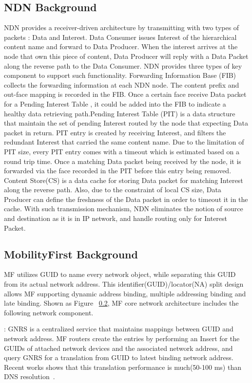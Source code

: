 \subsection{NDN Background}
NDN provides a receiver-driven architecture by transmitting with two types of packets : Data and Interest. Data Consumer issues Interest of the hierarchical content name and forward to Data Producer. When the interest arrives at the node that own this piece of content, Data Producer will reply with a Data Packet along the reverse path to the Data Consumer. NDN provides three types of key component to support such functionality. Forwarding Information Base (FIB) collects the forwarding information at each NDN node. The content prefix and out-face mapping is recorded in the FIB. Once a certain face receive Data packet for a Pending Interest Table , it could be added into the FIB to indicate a healthy data retrieving path.Pending Interest Table (PIT) is a data structure that maintain the set of pending Interest routed by the node that expecting Data packet in return. PIT entry is created by receiving Interest, and filters the redundant Interest that carried the same content name. Due to the limitation of PIT size, every PIT entry comes with a timeout which is estimated based on a round trip time. Once a matching Data packet being received by the node, it is forwarded via the face recorded in the PIT before this entry being removed. Content Store(CS) is a data cache for storing Data packet for matching Interest along the reverse path. Also, due to the constraint of local CS size, Data Producer can define the freshness of the Data packet in order to timeout it in the cache. With such transmission mechanism, NDN eliminates the notion of source and destination as it is in IP network, and handle routing only for Interest Packet.

\subsection{MobilityFirst Background}
MF utilizes GUID to name every network object, while separating this GUID from its actual network address. This identifier(GUID)/locator(NA) split design allows MF supporting dynamic address binding, multiple addressing binding and late binding. Shown as Figure ~\ref{}, MF core network architecture includes the following network component.

\vspace{1mm}: GNRS is a centralized service that maintains mappings between GUID and network address. MF routers create the entries by performing an Insert for the GUIDs of attached network devices and the associated network address, and query GNRS for a translation from GUID to latest binding network address. Recent works shows that this translation performance is much(50-100 ms) than DNS resolution~\cite{vu2012dmap}.

